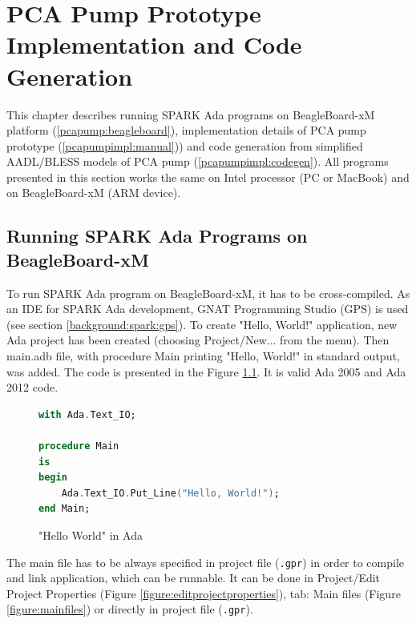 
\cleardoublepage


\chapter{PCA Pump Prototype Implementation and Code Generation}
\label{pcapumpimpl}

This chapter describes running SPARK Ada programs on BeagleBoard-xM platform (\ref{pcapump:beagleboard}), implementation details of PCA pump prototype (\ref{pcapumpimpl:manual})) and code generation from simplified AADL/BLESS models of PCA pump (\ref{pcapumpimpl:codegen}). All programs presented in this section works the same on Intel processor (PC or MacBook) and on BeagleBoard-xM (ARM device).


\section{Running SPARK Ada Programs on BeagleBoard-xM}
\label{pcapumpimpl:beagleboard}

To run SPARK Ada program on BeagleBoard-xM, it has to be cross-compiled. As an IDE for SPARK Ada development, GNAT Programming Studio (GPS) is used (see section \ref{background:spark:gps}). To create "Hello, World!" application, new Ada project has been created (choosing Project/New... from the menu). Then main.adb file, with procedure Main printing "Hello, World!" in standard output, was added. The code is presented in the Figure \ref{listing:HelloWorld}. It is valid Ada 2005 and Ada 2012 code.

\begin{figure}
\singlespacing
\begin{lstlisting}[language=ada, frame=single, gobble=0]
with Ada.Text_IO;

procedure Main
is
begin
    Ada.Text_IO.Put_Line("Hello, World!");    
end Main;
\end{lstlisting} 
\doublespacing
\caption{"Hello World" in Ada}
\label{listing:HelloWorld}
\end{figure}


The main file has to be always specified in project file (\lstinline{.gpr}) in order to compile and link application, which can be runnable. It can be done in Project/Edit Project Properties (Figure \ref{figure:editprojectproperties}), tab: Main files (Figure \ref{figure:mainfiles}) or directly in project file (\lstinline{.gpr}).

